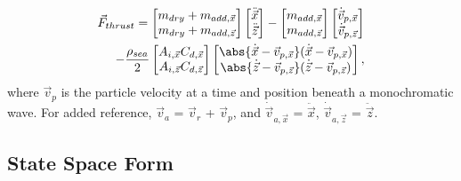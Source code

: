 \documentclass[letterpaper, 10 pt, conferences]{ieeeconf}  %
\begin{document}
\begin{equation}
\begin{split}
\vec{F}_{thrust} = \begin{bmatrix} m_{dry}+m_{add,\vec{x}} \\ m_{dry}+m_{add,\vec{z}} \end{bmatrix} \begin{bmatrix} \ddot{\vec{x}} \\ \ddot{\vec{z}} \end{bmatrix} - \begin{bmatrix} m_{add,\vec{x}} \\ m_{add,\vec{z}} \end{bmatrix} \begin{bmatrix} \dot{\vec{v}}_{p,\vec{x}} \\ \dot{\vec{v}}_{p,\vec{z}} \end{bmatrix} \\- \frac{\rho_{sea}}{2} \begin{bmatrix} A_{i,\vec{x}}C_{d,\vec{x}} \\ A_{i,\vec{z}}C_{d,\vec{z}} \end{bmatrix} \begin{bmatrix} \abs{\dot{\vec{x}}-\vec{v}_{p,\vec{x}}} (\dot{\vec{x}}-\vec{v}_{p,\vec{x}}) \\ \abs{\dot{\vec{z}}-\vec{v}_{p,\vec{z}}} (\dot{\vec{z}}-\vec{v}_{p,\vec{z}}) \end{bmatrix},
\label{eqn4}
\end{split}
\end{equation}
where $\vec{v}_p$ is the particle velocity at a time and position beneath a monochromatic wave. For added reference, $\vec{v}_a$ = $\vec{v}_r$ + $\vec{v}_p$, and $\dot{\vec{v}}_{a,\vec{x}}$ = $\ddot{\vec{x}}$, $\dot{\vec{v}}_{a,\vec{z}}$ = $\ddot{\vec{z}}$.

\subsection{State Space Form}
\end{document}
